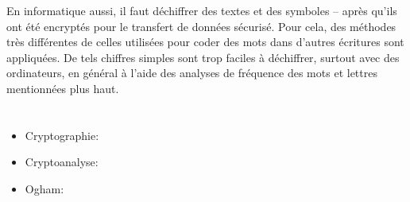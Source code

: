 {{En informatique aussi, il faut déchiffrer des textes et des symboles – après qu’ils ont été encryptés pour le transfert de données sécurisé. Pour cela, des méthodes très différentes de celles utilisées pour coder des mots dans d’autres écritures sont appliquées. De tels chiffres simples sont trop faciles à déchiffrer, surtout avec des ordinateurs, en général à l’aide des analyses de fréquence des mots et lettres mentionnées plus haut.



\section*{\BrochureWebsitesAndKeywords}
{\raggedright
\begin{itemize}
  \item Cryptographie: \href{https://fr.wikipedia.org/wiki/Cryptographie}{}
  \item Cryptoanalyse: \href{https://fr.wikipedia.org/wiki/Cryptanalyse}{}
  \item Ogham: \href{https://fr.wikipedia.org/wiki/Ogham}{}
\end{itemize}


}

}{}

\def\AuthorColreavyE{} %
\def\AuthorLehtimakiT{} %
\def\AuthorBarichelloL{} %
\def\AuthorStijfA{} %
\def\AuthorFutschekG{} %
\def\AuthorDatzkoC{} %
\def\AuthorPluharZ{} %
\def\AuthorPohlW{} %
\def\AuthorPelletE{} %

\newpage}{}
